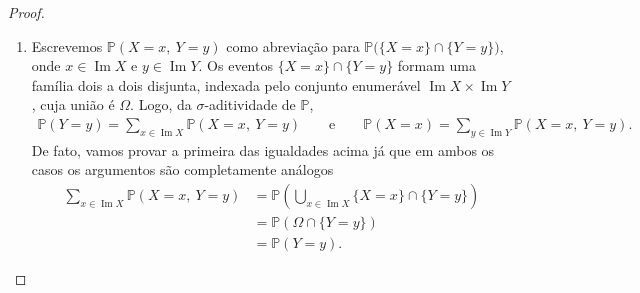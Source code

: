 \documentclass[12pt,portuguese]{article}
\theoremstyle{definition}
\begin{document}
\begin{proof}
\begin{enumerate}[label=(\alph*)]
\item Escrevemos $\mathbb{P}(X=x,\ Y=y)$ como abreviação para
$\mathbb{P}\bigl(\{X=x\}\cap\{Y=y\}\bigr)$, onde $x \in \operatorname{Im} X$ e
$y \in \operatorname{Im} Y$. Os eventos $\{X=x\}\cap\{Y=y\}$ formam uma família dois a dois
disjunta, indexada pelo conjunto enumerável $\operatorname{Im} X \times \operatorname{Im} Y$,
cuja união é $\Omega$. Logo, da $\sigma$-aditividade de $\mathbb{P}$,
\begin{align*}
\mathbb{P}(Y=y) = \sum_{x \in \operatorname{Im} X} \mathbb{P}(X=x,\ Y=y)
\qquad\text{e}\qquad
\mathbb{P}(X=x) = \sum_{y \in \operatorname{Im} Y} \mathbb{P}(X=x,\ Y=y).
\end{align*}
De fato, vamos provar a primeira das igualdades acima já que em ambos os casos
os argumentos são completamente análogos
\begin{align*}
\sum_{x \in \operatorname{Im} X} \mathbb{P}(X=x,\ Y=y)
&=
\mathbb{P}\left( \bigcup_{x \in \operatorname{Im} X} \{X=x\}\cap \{Y=y\} \right)
\\[0.3cm]
&=
\mathbb{P}\left( \Omega\cap \{Y=y\} \right)
\\[0.3cm]
&=
\mathbb{P}(Y=y).
\end{align*}



\end{enumerate}
\end{proof}
\end{document}

